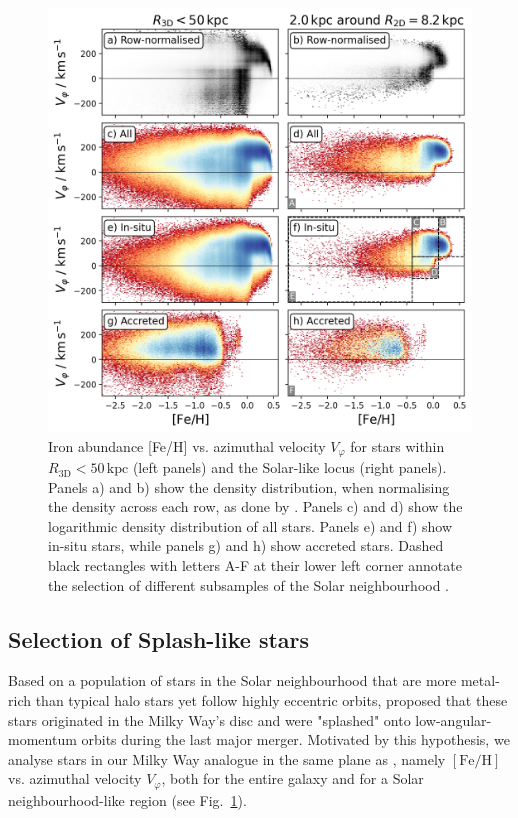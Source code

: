 \documentclass[fleqn,usenatbib]{mnras}
\begin{document}
\begin{figure}
    \centering
    \includegraphics[width=\columnwidth]{figures/splash_feh_vphi.png}
    \caption{{Iron abundance [Fe/H]} vs. azimuthal velocity $V_\varphi$ for stars within $R_\mathrm{3D} < 50\,\mathrm{kpc}$ (left panels) and the Solar-like locus (right panels). Panels a) and b) show the density distribution, when normalising the density across each row, as done by \citet[][see their Fig~1]{Belokurov2006}. Panels c) and d) show the logarithmic density distribution of all stars. Panels e) and f) show in-situ stars, while panels g) and h) show accreted stars. Dashed black rectangles with letters A-F at their lower left corner annotate the selection of different subsamples of the Solar neighbourhood \href{https://github.com/svenbuder/gse_nihaouhd/tree/main/figures}{\faGithub}.}
    \label{fig:splash_feh_vphi}
\end{figure}

\subsection{Selection of Splash-like stars}

Based on a population of stars in the Solar neighbourhood that are more metal-rich than typical halo stars yet follow highly eccentric orbits, \citet{Belokurov2020} proposed that these stars originated in the Milky Way’s disc and were "splashed" onto low-angular-momentum orbits during the last major merger. Motivated by this hypothesis, we analyse stars in our Milky Way analogue in the same plane as \citet{Belokurov2020}, namely $\mathrm{[Fe/H]}$ vs. azimuthal velocity $V_\varphi$, both for the entire galaxy and for a Solar neighbourhood-like region (see Fig.~\ref{fig:splash_feh_vphi}).
\end{document}
